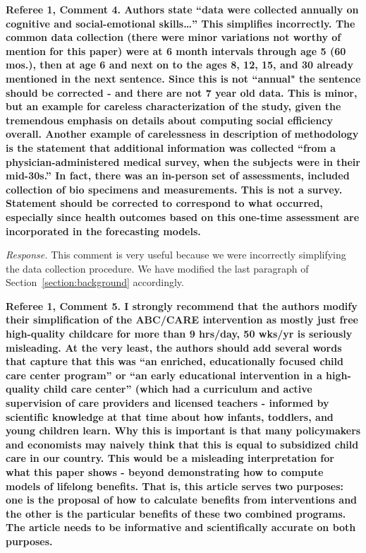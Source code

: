 \noindent \textbf{Referee 1, Comment 4. Authors state ``data were collected annually on cognitive and social-emotional skills…'' This simplifies incorrectly. The common data collection (there were minor variations not worthy of mention for this paper) were at 6 month intervals through age 5 (60 mos.), then at age 6 and next on to the ages 8, 12, 15, and 30 already mentioned in the next sentence. Since this is not ``annual" the sentence should be corrected - and there are not 7 year old data. This is minor, but an example for careless characterization of the study, given the tremendous emphasis on details about computing social efficiency overall. Another example of carelessness in description of methodology is the statement that additional information was collected ``from a physician-administered medical survey, when the subjects were in their mid-30s.'' In fact, there was an in-person set of assessments, included collection of bio specimens and measurements. This is not a survey. Statement should be corrected to correspond to what occurred, especially since health outcomes based on this one-time assessment are incorporated in the forecasting models.}

\noindent \textit{Response.} This comment is very useful because we were incorrectly simplifying the data collection procedure. We have modified the last paragraph of Section~\ref{section:background} accordingly.

\noindent \textbf{Referee 1, Comment 5. I strongly recommend that the authors modify their simplification of the ABC/CARE intervention as mostly just free high-quality childcare for more than 9 hrs/day, 50 wks/yr is seriously misleading. At the very least, the authors should add several words that capture that this was ``an enriched, educationally focused child care center program'' or ``an early educational intervention in a high-quality child care center'' (which had a curriculum and active supervision of care providers and licensed teachers - informed by scientific knowledge at that time about how infants, toddlers, and young children learn. Why this is important is that many policymakers and economists may naively think that this is equal to subsidized child care in our country. This would be a misleading interpretation for what this paper shows - beyond demonstrating how to compute models of lifelong benefits. That is, this article serves two purposes: one is the proposal of how to calculate benefits from interventions and the other is the particular benefits of these two combined programs. The article needs to be informative and scientifically accurate on both purposes.}

